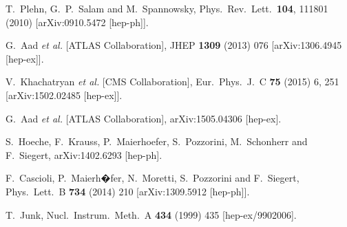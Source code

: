 \documentclass[preprintnumbers,superscriptaddress,nofootinbib,aps,prd,floatfix]{revtex4}
\begin{document}
\begin{thebibliography}{99}
        
  T.~Plehn, G.~P.~Salam and M.~Spannowsky,
  Phys.\ Rev.\ Lett.\  {\bf 104}, 111801 (2010)
  [arXiv:0910.5472 [hep-ph]].
  

  G.~Aad {\it et al.}  [ATLAS Collaboration],
  JHEP {\bf 1309} (2013) 076
  [arXiv:1306.4945 [hep-ex]].
              
  
  
  V.~Khachatryan {\it et al.} [CMS Collaboration],
  Eur.\ Phys.\ J.\ C {\bf 75} (2015) 6,  251
  [arXiv:1502.02485 [hep-ex]].
  
  G.~Aad {\it et al.} [ATLAS Collaboration],
  arXiv:1505.04306 [hep-ex].
  
  S.~Hoeche, F.~Krauss, P.~Maierhoefer, S.~Pozzorini, M.~Schonherr and F.~Siegert,
  arXiv:1402.6293 [hep-ph].
  
  F.~Cascioli, P.~Maierh�fer, N.~Moretti, S.~Pozzorini and F.~Siegert,
  Phys.\ Lett.\ B {\bf 734} (2014) 210
  [arXiv:1309.5912 [hep-ph]].
 
  T.~Junk,
  Nucl.\ Instrum.\ Meth.\ A {\bf 434} (1999) 435
  [hep-ex/9902006].
  

\end{thebibliography}
\end{document}
